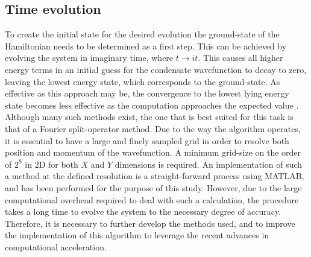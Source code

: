  \subsection{Time evolution}
 To create the initial state for the desired evolution the ground-state of the Hamiltonian needs to be determined as a first step. This can be achieved by evolving the system in imaginary time, where $t\rightarrow it$. This causes all higher energy terms in an initial guess for the condensate wavefunction to decay to zero, leaving the lowest energy state, which corresponds to the ground-state. As effective as this approach may be, the convergence to the lowest lying energy state becomes less effective as the computation approaches the expected value \cite{Vtx:Danaila_pra_2005}. Although many such methods exist, the one that is best suited for this task is that of a Fourier split-operator method. Due to the way the algorithm operates, it is essential to have a large and finely sampled grid in order to resolve both position and momentum of the wavefunction. A minimum grid-size on the order of $2^8$ in 2D for both $X$ and $Y$ dimensions is required. An implementation of such a method at the defined resolution is a straight-forward process using MATLAB, and has been performed for the purpose of this study. However, due to the large computational overhead required to deal with such a calculation, the procedure takes a long time to evolve the system to the necessary degree of accuracy. Therefore, it is necessary to further develop the methods used, and to improve the implementation of this algorithm to leverage the recent advances in computational acceleration.








